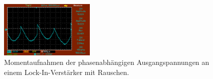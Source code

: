 \begin{figure}
\begin{minipage}{0.5\textwidth}
        \caption{$\phi = \SI{300}{\degree}$.} 
        \label{fig:26}
    \end{minipage}
    \vspace{1cm}
    \vfill
        \centering
        \includegraphics[width=0.4\textwidth]{bilder/360mit.png}
        \caption{$\phi = \SI{360}{\degree}$.} 
        \label{fig:27}
    \caption{Momentaufnahmen der phasenabhängigen Ausgangspannungen an einem Lock-In-Verstärker mit Rauschen.}
\end{figure}

